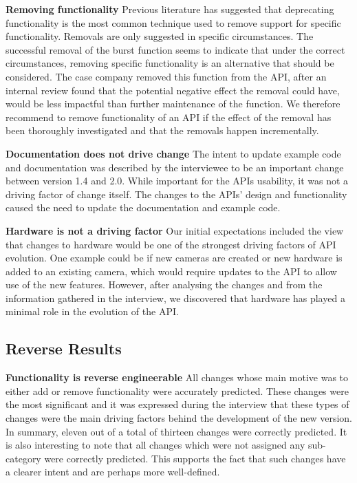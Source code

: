 \documentclass{sig-alternate}
\begin{document}
\smallskip \noindent
\textbf{Removing functionality  } %
Previous literature has suggested that deprecating functionality is the most common technique used to remove support for specific functionality. Removals are only suggested in specific circumstances. The successful removal of the burst function seems to indicate that under the correct circumstances, removing specific functionality is an alternative that should be considered. The case company removed this function from the API, after an internal review found that the potential negative effect the removal could have, would be less impactful than further maintenance of the function. We therefore recommend to remove functionality of an API if the effect of the removal has been thoroughly investigated and that the removals happen incrementally.

\smallskip \noindent
\textbf{Documentation does not drive change  } %
The intent to update example code and documentation was described by the interviewee to be an important change between version 1.4 and 2.0. While important for the APIs usability, it was not a driving factor of change itself. The changes to the APIs' design and functionality caused the need to update the documentation and example code.

\smallskip \noindent
\textbf{Hardware is not a driving factor  } %
Our initial expectations included the view that changes to hardware would be one of the strongest driving factors of API evolution. One example could be if new cameras are created or new hardware is added to an existing camera, which would require updates to the API to allow use of the new features. However, after analysing the changes and from the information gathered in the interview, we discovered that hardware has played a minimal role in the evolution of the API. 


\subsection{Reverse Results}

\noindent
\textbf{Functionality is reverse engineerable  } %
All changes whose main motive was to either add or remove functionality were accurately predicted. These changes were the most significant and it was expressed during the interview that these types of changes were the main driving factors behind the development of the new version. In summary, eleven out of a total of thirteen changes were correctly predicted. It is also interesting to note that all changes which were not assigned any sub-category were correctly predicted. This supports the fact that such changes have a clearer intent and are perhaps more well-defined.
\end{document}
